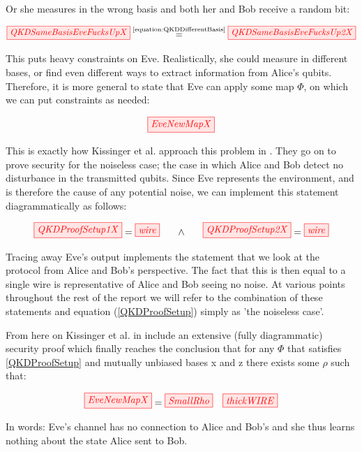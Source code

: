 \documentclass[]{article}
\newcommand{\equaltext}[1]{\ensuremath{\stackrel{\text{#1}}{=}}}
\begin{document}
Or she measures in the wrong basis and both her and Bob receive a random bit:

\begin{equation}
	\tikzfig{QKDSameBasisEveFucksUpX} \equaltext{\ref{equation:QKDDifferentBasis}} \tikzfig{QKDSameBasisEveFucksUp2X}
\end{equation}

This puts heavy constraints on Eve. Realistically, she could measure in different bases, or find even different ways to extract information from Alice's qubits. Therefore, it is more general to state that Eve can apply some map $\Phi$, on which we can put constraints as needed:

\begin{equation}
	\label{equation:EveNewMap}
	\tikzfig{EveNewMapX}
\end{equation}

This is exactly how Kissinger et al. approach this problem in \cite{Kissinger2017}. They go on to prove security for the noiseless case; the case in which Alice and Bob detect no disturbance in the transmitted qubits. Since Eve represents the environment, and is therefore the cause of any potential noise, we can implement this statement diagrammatically as follows:

\begin{equation}
	\label{QKDProofSetup}
	\tikzfig{QKDProofSetup1X} = \tikzfig{wire} ~~~~~ \land ~~~~~ \tikzfig{QKDProofSetup2X} = \tikzfig{wire}
\end{equation}

Tracing away Eve's output implements the statement that we look at the protocol from Alice and Bob's perspective. The fact that this is then equal to a single wire is representative of Alice and Bob seeing no noise. At various points throughout the rest of the report we will refer to the combination of these statements and equation (\ref{QKDProofSetup}) simply as 'the noiseless case'.

From here on Kissinger et al. in \cite{Kissinger2017} include an extensive (fully diagrammatic) security proof which finally reaches the conclusion that for any $\Phi$ that satisfies \ref{QKDProofSetup} and mutually unbiased bases x and z there exists some $\rho$ such that:

\begin{equation}
\tikzfig{EveNewMapX} = \tikzfig{SmallRho}  ~~~ \tikzfig{thickWIRE}
\end{equation}

In words: Eve's channel has no connection to Alice and Bob's and she thus learns nothing about the state Alice sent to Bob.
\end{document}
